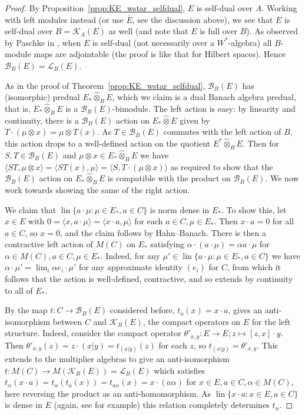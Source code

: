 \documentclass[a4paper,11pt]{article}
\theoremstyle{plain}
\theoremstyle{remark}
\newcommand{\mc}[1]{\mathcal{#1}}
\newcommand{\ip}[2]{{\langle {#1} , {#2} \rangle}}
\newcommand{\lin}{\operatorname{lin}}
\newcommand{\proten}{\widehat\otimes}
\begin{document}
\begin{proof}
By Proposition~\ref{prop:KE_wstar_selfdual}, $E$ is self-dual over $A$.  Working with left modules instead (or use $\overline E$, see the discussion above), we see that $E$ is self-dual over $B = \mc K_A(E)$ as well (and note that $E$ is full over $B$).  As observed by Paschke in \cite[Proposition~3.4]{paschke_inner_prod_mods}, when $E$ is self-dual (not necessarily over a $W^*$-algebra) all $B$-module maps are adjointable (the proof is like that for Hilbert spaces).  Hence $\mc B_B(E) = \mc L_B(E)$.

As in the proof of Theorem~\ref{prop:KE_wstar_selfdual}, $\mc B_B(E)$ has (isomorphic) predual $E_* \proten_B E$, which we claim is a dual Banach algebra predual, that is, $E_* \proten_B E$ is a $\mc B_B(E)$-bimodule.  The left action is easy: by linearity and continuity, there is a $\mc B_B(E)$ action on $E_* \proten E$ given by $T\cdot(\mu\otimes x) = \mu\otimes T(x)$.  As $T\in\mc B_B(E)$  commutes with the left action of $B$, this action drops to a well-defined action on the quotient $E^* \proten_B E$.  Then
for $S, T \in\mc B_B(E)$ and $\mu\otimes x \in E_* \proten_B E$ we have $\ip{ST}{\mu\otimes x} = \ip{ST(x)}{\mu} = \ip{S}{T\cdot(\mu\otimes x)}$ as required to show that the $\mc B_B(E)$ action on $E_* \proten_B E$ is compatible with the product on $\mc B_B(E)$.  We now work towards showing the same of the right action.

We claim that $\lin\{ a\cdot \mu : \mu\in E_*, a\in C \}$ is norm dense in $E_*$.  To show this, let $x\in E$ with $0 = \ip{x}{a\cdot\mu} = \ip{x\cdot a}{\mu}$ for each $a\in C, \mu\in E_*$.  Then $x\cdot a=0$ for all $a\in C$, so $x=0$, and the claim follows by Hahn--Banach.  There is then a contractive left action of $M(C)$ on $E_*$ satisfying $\alpha\cdot (a\cdot\mu) = \alpha a \cdot \mu$ for $\alpha\in M(C), a\in C, \mu\in E_*$.  Indeed, for any $\mu' \in \lin\{ a\cdot \mu : \mu\in E_*, a\in C \}$ we have $\alpha \cdot \mu' = \lim_i \alpha e_i \cdot \mu'$ for any approximate identity $(e_i)$ for $C$, from which it follows that the action is well-defined, contractive, and so extends by continuity to all of $E_*$.

By \cite[Proposition~1.10]{BMS_quasimults} the map $t \colon C \to \mc B_B(E)$ considered before, $t_a(x) = x\cdot a$, gives an anti-isomorphism between $C$ and $\mc K_B(E)$, the compact operators on $E$ for the left structure.  Indeed, consider the compact operator $\theta'_{x,y} \colon E\to E; z\mapsto [z,x]\cdot y$.  Then $\theta'_{x,y}(z) = z \cdot (x|y) = t_{(x|y)}(z)$ for each $z$, so $t_{(x|y)} = \theta'_{x,y}$.  This extends to the multiplier algebras to give an anti-isomorphism $t \colon M(C) \to M(\mc K_B(E)) = \mc L_B(E)$ which satisfies $t_\alpha(x\cdot a) = t_\alpha (t_a(x)) = t_{a \alpha}(x) = x\cdot (a \alpha)$ for $x\in E, a\in C, \alpha\in M(C)$, here reversing the product as an anti-homomorphism.  As $\lin\{ x\cdot a : x\in E, a\in C \}$ is dense in $E$ (again, see \cite[page~5]{Lance_HilbModsBook} for example) this relation completely determines $t_\alpha$.


\end{proof}
\end{document}
